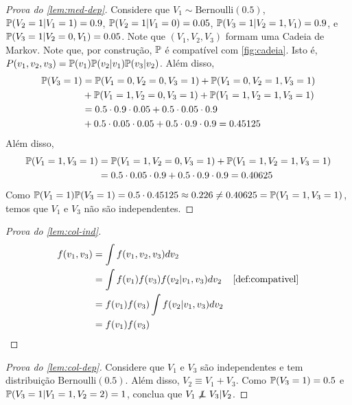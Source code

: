 \begin{proof}[Prova do \cref{lem:med-dep}]
 Considere que $V_1 \sim \text{Bernoulli}(0.5)$,
 $\P(V_2=1|V_1=1)=0.9$, $\P(V_2=1|V_1=0)=0.05$,
 $\P(V_3=1|V_2=1,V_1)=0.9$, e $\P(V_3=1|V_2=0,V_1)=0.05$.
 Note que $(V_1,V_2,V_3)$ formam uma Cadeia de Markov.
 Note que, por construção, $\P$ é 
 compatível com \cref{fig:cadeia}.
 Isto é, $P(v_1,v_2,v_3) = \P(v_1)\P(v_2|v_1)\P(v_3|v_2)$.
 Além disso,
 \begin{align*}
  \P(V_3 = 1) &= \P(V_1=0, V_2=0, V_3=1) + \P(V_1=0, V_2=1, V_3=1) \\
              &+ \P(V_1=1, V_2=0, V_3=1) + \P(V_1=1, V_2=1, V_3=1) \\
              &= 0.5 \cdot 0.9 \cdot 0.05 + 0.5 \cdot 0.05 \cdot 0.9 \\
              &+ 0.5 \cdot 0.05 \cdot 0.05 + 0.5 \cdot 0.9 \cdot 0.9 
              = 0.45125
 \end{align*}
 Além disso,
 \begin{align*}
  \P(V_1 = 1, V_3 = 1)
  &= \P(V_1 = 1, V_2 = 0, V_3 = 1) 
  +  \P(V_1 = 1, V_2 = 1, V_3 = 1) \\
  &= 0.5 \cdot 0.05 \cdot 0.9 + 0.5 \cdot 0.9 \cdot 0.9
  = 0.40625
 \end{align*}
 Como $\P(V_1=1)\P(V_3=1) = 0.5 \cdot 0.45125 \approx 0.226 \neq 
 0.40625 = \P(V_1=1,V_3=1)$,
 temos que $V_1$ e $V_3$ não são independentes.
\end{proof}

\begin{proof}[Prova do \cref{lem:col-ind}]
 \begin{align*}
  f(v_1,v_3) 
  &= \int f(v_1, v_2, v_3) dv_2 \\
  &= \int f(v_1)f(v_3)f(v_2|v_1,v_3) dv_2 
  & \text{\cref{def:compativel}} \\
  &= f(v_1)f(v_3) \int f(v_2|v_1,v_3) dv_2 \\
  &= f(v_1)f(v_3)
 \end{align*}
\end{proof}

\begin{proof}[Prova do \cref{lem:col-dep}]
 Considere que $V_1$ e $V_3$ são
 independentes e tem distribuição $\text{Bernoulli}(0.5)$.
 Além disso, $V_2 \equiv V_1+V_3$.
 Como $\P(V_3 = 1) = 0.5$ e
 $\P(V_3=1|V_1=1,V_2=2) = 1$, conclua que
 $V_1 \not\ind V_3 | V_2$.
\end{proof}

\section{}

